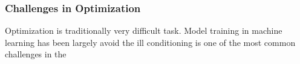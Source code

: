 \subsubsection{Challenges in Optimization}

Optimization is traditionally very difficult task. Model training in machine learning has been largely avoid 
the ill conditioning is one of the most common challenges in the 